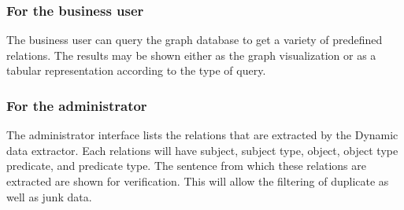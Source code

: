 \subsubsection{For the business user}
\par The business user can query the graph database to get a variety of predefined relations. The results may be shown either as the graph visualization or as a tabular representation according to the type of query.
\subsubsection{For the administrator}
\par The administrator interface lists the relations that are extracted by the Dynamic data extractor. Each relations will have subject, subject type, object, object type predicate, and predicate type. The sentence from which these relations are extracted are shown for verification. This will allow the filtering of duplicate as well as junk data.